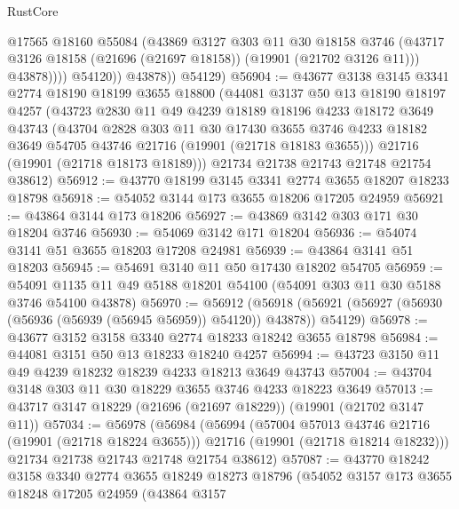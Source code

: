 \begin{lexlean}{RustCore}
\begin{coremodule}
                    @17565
                    @18160
                    @55084
                    (@43869
                      @3127
                      @303
                      @11
                      @30
                      @18158
                      @3746
                      (@43717 @3126 @18158 (@21696 (@21697 @18158)) (@19901 (@21702 @3126 @11)))
                      @43878))))
              @54120))
          @43878))
      @54129)
@56904 := @43677
    @3138
    @3145
    @3341
    @2774
    @18190
    @18199
    @3655
    @18800
    (@44081
      @3137
      @50
      @13
      @18190
      @18197
      @4257
      (@43723
        @2830
        @11
        @49
        @4239
        @18189
        @18196
        @4233
        @18172
        @3649
        @43743
        (@43704
          @2828
          @303
          @11
          @30
          @17430
          @3655
          @3746
          @4233
          @18182
          @3649
          @54705
          @43746
          @21716
          (@19901 (@21718 @18183 @3655)))
        @21716
        (@19901 (@21718 @18173 @18189)))
      @21734
      @21738
      @21743
      @21748
      @21754
      @38612)
@56912 := @43770 @18199 @3145 @3341 @2774 @3655 @18207 @18233 @18798
@56918 := @54052 @3144 @173 @3655 @18206 @17205 @24959
@56921 := @43864 @3144 @173 @18206
@56927 := @43869 @3142 @303 @171 @30 @18204 @3746
@56930 := @54069 @3142 @171 @18204
@56936 := @54074 @3141 @51 @3655 @18203 @17208 @24981
@56939 := @43864 @3141 @51 @18203
@56945 := @54691 @3140 @11 @50 @17430 @18202 @54705
@56959 := @54091 @1135 @11 @49 @5188 @18201 @54100 (@54091 @303 @11 @30 @5188 @3746 @54100 @43878)
@56970 := @56912
    (@56918 (@56921 (@56927 (@56930 (@56936 (@56939 (@56945 @56959)) @54120)) @43878)) @54129)
@56978 := @43677 @3152 @3158 @3340 @2774 @18233 @18242 @3655 @18798
@56984 := @44081 @3151 @50 @13 @18233 @18240 @4257
@56994 := @43723 @3150 @11 @49 @4239 @18232 @18239 @4233 @18213 @3649 @43743
@57004 := @43704 @3148 @303 @11 @30 @18229 @3655 @3746 @4233 @18223 @3649
@57013 := @43717 @3147 @18229 (@21696 (@21697 @18229)) (@19901 (@21702 @3147 @11))
@57034 := @56978
    (@56984
      (@56994
        (@57004 @57013 @43746 @21716 (@19901 (@21718 @18224 @3655)))
        @21716
        (@19901 (@21718 @18214 @18232)))
      @21734
      @21738
      @21743
      @21748
      @21754
      @38612)
@57087 := @43770
    @18242
    @3158
    @3340
    @2774
    @3655
    @18249
    @18273
    @18796
    (@54052
      @3157
      @173
      @3655
      @18248
      @17205
      @24959
      (@43864
        @3157

\end{coremodule}
\end{lexlean}
